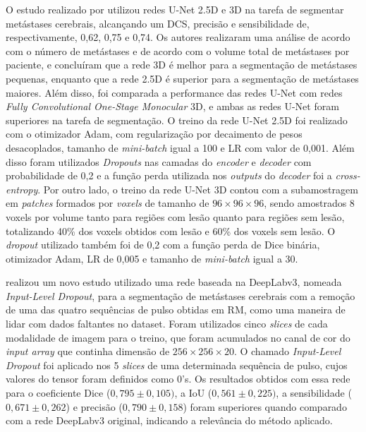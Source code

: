 O estudo realizado por \cite{Yoo:2021} utilizou redes U-Net 2.5D e 3D na tarefa de segmentar metástases cerebrais, alcançando um DCS, precisão e sensibilidade de, respectivamente, 0,62, 0,75 e 0,74. Os autores realizaram uma análise de acordo com o número de metástases e de acordo com o volume total de metástases por paciente, e concluíram que a rede 3D é melhor para a segmentação de metástases pequenas, enquanto que a rede 2.5D é superior para a segmentação de metástases maiores. Além disso, foi comparada a performance das redes U-Net com redes \textit{Fully Convolutional One-Stage Monocular} 3D, e ambas as redes U-Net foram superiores na tarefa de segmentação. O treino da rede U-Net 2.5D foi realizado com o otimizador Adam, com regularização por decaimento de pesos desacoplados, tamanho de \textit{mini-batch} igual a 100 e LR com valor de 0,001. Além disso foram utilizados \textit{Dropouts} nas camadas do \textit{encoder} e \textit{decoder} com probabilidade de 0,2 e a função perda utilizada nos \textit{outputs} do \textit{decoder} foi a \textit{cross-entropy}. Por outro lado, o treino da rede U-Net 3D contou com a subamostragem em \textit{patches} formados por \textit{voxels} de tamanho de $96\times96\times96$, sendo amostrados 8 voxels por volume tanto para regiões com lesão quanto para regiões sem lesão, totalizando 40\% dos voxels obtidos com lesão e 60\% dos voxels sem lesão. O \textit{dropout} utilizado também foi de 0,2 com a função perda de Dice binária, otimizador Adam, LR de 0,005 e tamanho de \textit{mini-batch} igual a 30.

\cite{Grøvik:2021} realizou um novo estudo utilizado uma rede baseada na DeepLabv3, nomeada \textit{Input-Level Dropout}, para a segmentação de metástases cerebrais com a remoção de uma das quatro sequências de pulso obtidas em RM, como uma maneira de lidar com dados faltantes no dataset. Foram utilizados cinco \textit{slices} de cada modalidade de imagem para o treino, que foram acumulados no canal de cor do \textit{input array} que continha dimensão de $256 \times 256 \times 20$. O chamado \textit{Input-Level Dropout} foi aplicado nos 5 \textit{slices} de uma determinada sequência de pulso, cujos valores do tensor foram definidos como 0's. Os resultados obtidos com essa rede para o coeficiente Dice ($0,795 \pm 0,105)$, a IoU ($0,561 \pm 0,225)$, a sensibilidade ($0,671 \pm 0,262$) e precisão ($0,790 \pm 0,158$) foram superiores quando comparado com a rede DeepLabv3 original, indicando a relevância do método aplicado. 

